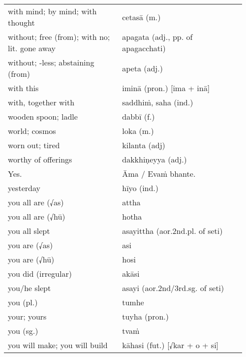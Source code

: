 \documentclass[a5paper]{memoir}
\begin{document}
\begin{longtable}{L{0.48\linewidth} L{0.48\linewidth} H}
with mind; by mind; with thought & cetasā (m.) & \\[0pt]
without; free (from); with no; lit. gone away & apagata (adj., pp. of apagacchati) & \\[0pt]
without; -less; abstaining (from) & apeta (adj.) & \\[0pt]
with this & iminā (pron.) [ima + inā] & \\[0pt]
with, together with & saddhiṁ, saha (ind.) & \\[0pt]
wooden spoon; ladle & dabbī (f.) & \\[0pt]
world; cosmos & loka (m.) & \\[0pt]
worn out; tired & kilanta (adj) & \\[0pt]
worthy of offerings & dakkhiṇeyya (adj.) & \\[0pt]
Yes. & Āma / Evaṁ bhante. & \\[0pt]
yesterday & hīyo (ind.) & \\[0pt]
you all are (√as) & attha & \\[0pt]
you all are (√hū) & hotha & \\[0pt]
you all slept & asayittha (aor.2nd.pl. of seti) & \\[0pt]
you are (√as) & asi & \\[0pt]
you are (√hū) & hosi & \\[0pt]
you did (irregular) & akāsi & \\[0pt]
you/he slept & asayi (aor.2nd/3rd.sg. of seti) & \\[0pt]
you (pl.) & tumhe & \\[0pt]
your; yours & tuyha (pron.) & \\[0pt]
you (sg.) & tvaṁ & \\[0pt]
you will make; you will build & kāhasi (fut.) [√kar + o + si] & \\[0pt]
\end{longtable}
\end{document}
